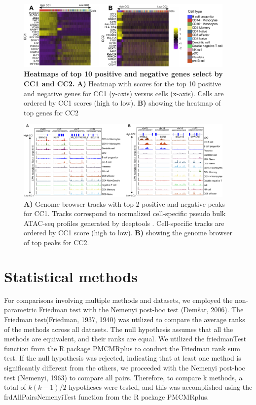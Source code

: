 \begin{figure}[!h]
	\centering
	\includegraphics[width=0.95\textwidth]{CC_Genes/fig}
	\vspace{0.1cm}
	\caption[Heatmaps of top 10 positive and negative genes select by CC1 and CC2.]{\textbf{Heatmaps of top 10 positive and negative genes select by CC1 and CC2.} \textbf{A)} Heatmap with scores for the top 10 positive and negative genes for CC1 (y-axis) versus cells (x-axis). Cells are ordered by CC1 scores (high to low). \textbf{B)} showing the heatmap of top genes for CC2}
	\label{fig:CC_Genes}
\end{figure}


\begin{figure}[!h]
	\centering
	\includegraphics[width=0.95\textwidth]{CC_Peaks/fig}
	\vspace{0.1cm}
	\caption[Genome browser tracks of top 2 positive and negative peaks for CC1 and CC2.]{ \textbf{A)} Genome browser tracks with top 2 positive and negative peaks for CC1. Tracks correspond to normalized cell-specific pseudo bulk ATAC-seq profiles generated by deeptools \citep{ramirez2016deeptools2}. Cell-specific tracks are ordered by CC1 score (high to low). \textbf{B)} showing the genome browser of top peaks for CC2.}
	\label{fig:CC_Peaks}
\end{figure}

\section{Statistical methods}
For comparisons involving multiple methods and datasets, we employed the non-parametric Friedman test with the Nemenyi post-hoc test (Demšar, 2006). The Friedman test(Friedman, 1937, 1940) was utilized to compare the average ranks of the methods across all datasets. The null hypothesis assumes that all the methods are equivalent, and their ranks are equal. We utilized the friedmanTest function from the R package PMCMRplus to conduct the Friedman rank sum test. If the null hypothesis was rejected, indicating that at least one method is significantly different from the others, we proceeded with the Nemenyi post-hoc test (Nemenyi, 1963) to compare all pairs. Therefore, to compare k methods, a total of $k(k-1)/2$ hypotheses were tested, and this was accomplished using the frdAllPairsNemenyiTest function from the R package PMCMRplus.

